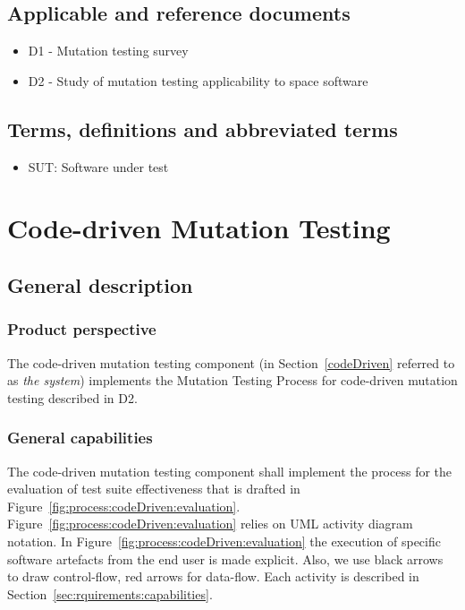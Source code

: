 
\section{Applicable and reference documents}

\begin{itemize}
\item{D1 - Mutation testing survey}
\item{D2 - Study of mutation testing applicability to space software}
\end{itemize}
\clearpage

\section{Terms, definitions and abbreviated terms}

\begin{itemize}
\item{SUT}: Software under test
\end{itemize}

\clearpage


\chapter{Code-driven Mutation Testing}
\label{chapter:codeDriven}

\section{General description}




\subsection{Product perspective}

\RQ{} The code-driven mutation testing component (in Section~\ref{codeDriven} referred to as \emph{the system}) implements the Mutation Testing Process for code-driven mutation testing described in D2.

\clearpage
\subsection{General capabilities}

\RQ{} The code-driven mutation testing component shall implement the process for the evaluation of test suite effectiveness that is drafted in Figure~\ref{fig:process:codeDriven:evaluation}. Figure~\ref{fig:process:codeDriven:evaluation} relies on UML activity diagram notation. In Figure~\ref{fig:process:codeDriven:evaluation} the execution of specific software artefacts from the end user is made explicit. Also, we use black arrows to draw control-flow, red arrows for data-flow. Each activity is described in Section~\ref{sec:rquirements:capabilities}.

